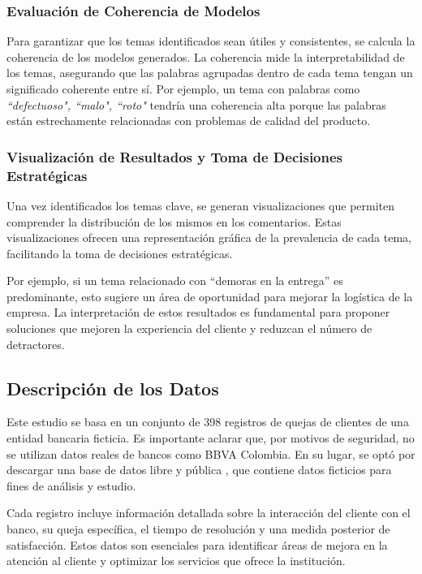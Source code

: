 \documentclass{matematicasud}
\begin{document}
\subsubsection{Evaluación de Coherencia de Modelos}
Para garantizar que los temas identificados sean útiles y consistentes, se calcula la coherencia de los modelos generados. La coherencia mide la interpretabilidad de los temas, asegurando que las palabras agrupadas dentro de cada tema tengan un significado coherente entre sí. Por ejemplo, un tema con palabras como \textit{``defectuoso", ``malo", ``roto"} tendría una coherencia alta porque las palabras están estrechamente relacionadas con problemas de calidad del producto.\cite{10}

\subsubsection{Visualización de Resultados y Toma de Decisiones Estratégicas}
Una vez identificados los temas clave, se generan visualizaciones que permiten comprender la distribución de los mismos en los comentarios. Estas visualizaciones ofrecen una representación gráfica de la prevalencia de cada tema, facilitando la toma de decisiones estratégicas.

Por ejemplo, si un tema relacionado con  ``demoras en la entrega'' es predominante, esto sugiere un área de oportunidad para mejorar la logística de la empresa. La interpretación de estos resultados es fundamental para proponer soluciones que mejoren la experiencia del cliente y reduzcan el número de detractores.


\subsection{Descripción de los Datos}

Este estudio se basa en un conjunto de 398 registros de quejas de clientes de una entidad bancaria ficticia. Es importante aclarar que, por motivos de seguridad, no se utilizan datos reales de bancos como BBVA Colombia. En su lugar, se optó por descargar una base de datos libre y pública \cite{7}, que contiene datos ficticios para fines de análisis y estudio.

Cada registro incluye información detallada sobre la interacción del cliente con el banco, su queja específica, el tiempo de resolución y una medida posterior de satisfacción. Estos datos son esenciales para identificar áreas de mejora en la atención al cliente y optimizar los servicios que ofrece la institución.
\end{document}
